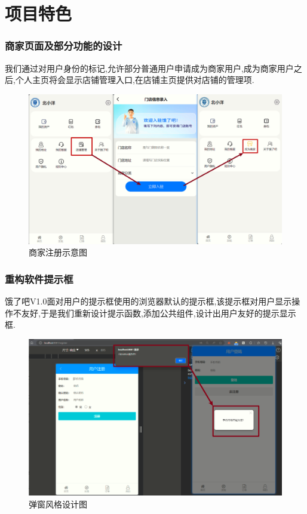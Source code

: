 \chapter{项目特色}

\subsection{商家页面及部分功能的设计}
我们通过对用户身份的标记,允许部分普通用户申请成为商家用户,成为商家用户之后,个人主页将会显示店铺管理入口,在店铺主页提供对店铺的管理项.

\begin{figure}[h]
    \centering
        \includegraphics[width=0.75\linewidth]{uiFigs/成为商家.png}
    \caption{商家注册示意图}
    \label{fig:sjzc}
\end{figure}




\subsection{重构软件提示框}
饿了吧V1.0面对用户的提示框使用的浏览器默认的提示框,该提示框对用户显示操作不友好,于是我们重新设计提示函数,添加公共组件,设计出用户友好的提示显示框.
\begin{figure}[H]
    \centering
        \includegraphics[width=0.75\linewidth]{uiFigs/弹窗风格.png}
    \caption{弹窗风格设计图}
    \label{fig:tcfg}
\end{figure}

